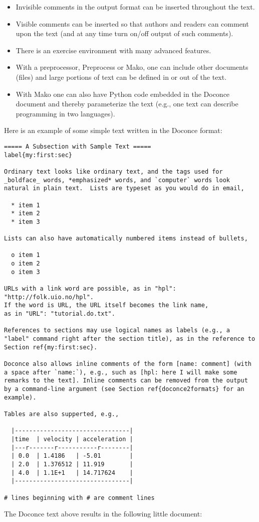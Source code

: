 \documentclass[%
oneside,                 %
final,                   %
10pt]{article}
\begin{document}
\begin{itemize}
  \item Invisible comments in the output format can be inserted throughout
    the text.

  \item Visible comments can be inserted so that authors and readers can
    comment upon the text (and at any time turn on/off output of such
    comments).

  \item There is an exercise environment with many advanced features.

  \item With a preprocessor, Preprocess or Mako, one can include
    other documents (files) and large portions of text can be defined
    in or out of the text.

  \item With Mako one can also have Python code
    embedded in the Doconce document and thereby parameterize the
    text (e.g., one text can describe programming in two languages).
\end{itemize}

\noindent
Here is an example of some simple text written in the Doconce format:
\begin{Verbatim}[fontsize=\fontsize{9pt}{9pt},tabsize=8,baselinestretch=0.85,
fontfamily=tt,xleftmargin=7mm]
===== A Subsection with Sample Text =====
label{my:first:sec}

Ordinary text looks like ordinary text, and the tags used for
_boldface_ words, *emphasized* words, and `computer` words look
natural in plain text.  Lists are typeset as you would do in email,

  * item 1
  * item 2
  * item 3

Lists can also have automatically numbered items instead of bullets,

  o item 1
  o item 2
  o item 3

URLs with a link word are possible, as in "hpl": "http://folk.uio.no/hpl".
If the word is URL, the URL itself becomes the link name,
as in "URL": "tutorial.do.txt".

References to sections may use logical names as labels (e.g., a
"label" command right after the section title), as in the reference to
Section ref{my:first:sec}.

Doconce also allows inline comments of the form [name: comment] (with
a space after `name:`), e.g., such as [hpl: here I will make some
remarks to the text]. Inline comments can be removed from the output
by a command-line argument (see Section ref{doconce2formats} for an
example).

Tables are also supperted, e.g.,

  |--------------------------------|
  |time  | velocity | acceleration |
  |---r-------r-----------r--------|
  | 0.0  | 1.4186   | -5.01        |
  | 2.0  | 1.376512 | 11.919       |
  | 4.0  | 1.1E+1   | 14.717624    |
  |--------------------------------|

# lines beginning with # are comment lines
\end{Verbatim}
\noindent
The Doconce text above results in the following little document:
\end{document}

